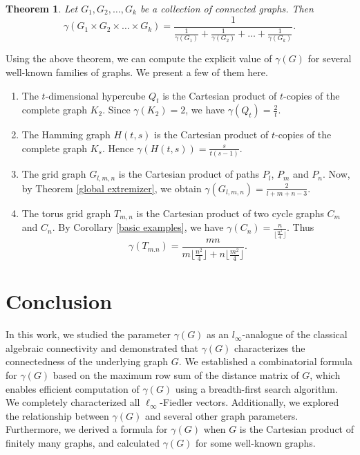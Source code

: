 \documentclass[12pt]{article}
\newtheorem{theorem}{Theorem}[section]
\begin{document}
{{			\begin{theorem}
				Let $G_1, G_2,\dots, G_k$ be a collection of connected graphs. Then
				$$
				\gamma(G_1 \times G_2 \times \dots \times G_k)=\frac{1}{\frac{1}{\gamma(G_1)}+\frac{1}{\gamma(G_2)}+\dots +\frac{1}{\gamma(G_k)}}.
				$$
			\end{theorem}
			
			
			
			Using the above theorem, we can compute the explicit value of $\gamma (G)$ for several well-known families of graphs. We present a few of them here.  
			
			\begin{enumerate}
				\item [(a)] The $t$-dimensional hypercube $Q_t$ is the Cartesian product of $t$-copies of the complete graph $K_2$. Since $\gamma(K_2)=2$, we have $\gamma(Q_t)=\frac{2}{t}$. 
				\item [(b)] The Hamming graph $H(t,s)$ is the Cartesian product of $t$-copies of the complete graph $K_s$. Hence $\gamma(H(t,s))=\frac{s}{t(s-1)}.$
				\item [(c)] The grid graph $G_{l,m,n}$ is the Cartesian product of paths $P_l$, $P_m$ and $P_n$.
				Now, by Theorem \ref{global extremizer}, we obtain $\gamma(G_{l,m,n})=\frac{2}{l+m+n-3}$.
				
				\item[(d)]  The torus grid graph $T_{m,n}$ is the Cartesian product of two        cycle graphs $C_m$ and $C_n$. By Corollary \ref{basic examples}, we have   $\gamma(C_n)=\frac{n}{\lfloor \frac{n^2}{4}\rfloor}$. Thus
				$$
				\gamma(T_{m.n})=\frac{mn}{m\lfloor \frac{n^2}{4} \rfloor +n\lfloor \frac{m^2}{4} \rfloor}.
				$$
			\end{enumerate}
			\section*{Conclusion}
			In this work, we studied the parameter $\gamma(G)$ as an $l_\infty$-analogue of the classical algebraic connectivity and demonstrated that $\gamma(G)$ characterizes the connectedness of the underlying graph $G$. We established a combinatorial formula for $\gamma(G)$ based on the maximum row sum of the distance matrix of $G$, which enables efficient computation of $\gamma(G)$ using a breadth-first search algorithm.  We  completely characterized all $\ell_\infty$-Fiedler vectors.  Additionally, we explored the relationship between $\gamma(G)$ and several other graph parameters. Furthermore, we derived a formula for $\gamma(G)$ when $G$ is the Cartesian product of finitely many graphs, and calculated $\gamma (G)$ for some well-known graphs.
			
}}
\end{document}
